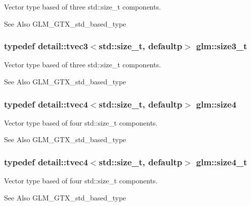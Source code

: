 Vector type based of three std\-::size\-\_\-t components. \begin{DoxySeeAlso}{See Also}
G\-L\-M\-\_\-\-G\-T\-X\-\_\-std\-\_\-based\-\_\-type 
\end{DoxySeeAlso}
\hypertarget{group__gtx__std__based__type_gad9ddaab6dd4c37ba46b74a1423ef2ba3}{
\subsubsection[{size3\-\_\-t}]{\setlength{\rightskip}{0pt plus 5cm}typedef detail\-::tvec3$<$std\-::size\-\_\-t, defaultp$>$ {\bf glm\-::size3\-\_\-t}}}\label{group__gtx__std__based__type_gad9ddaab6dd4c37ba46b74a1423ef2ba3}
Vector type based of three std\-::size\-\_\-t components. \begin{DoxySeeAlso}{See Also}
G\-L\-M\-\_\-\-G\-T\-X\-\_\-std\-\_\-based\-\_\-type 
\end{DoxySeeAlso}
\hypertarget{group__gtx__std__based__type_gac04a40cfe44b5035770cf26d98a9349d}{
\subsubsection[{size4}]{\setlength{\rightskip}{0pt plus 5cm}typedef detail\-::tvec4$<$std\-::size\-\_\-t, defaultp$>$ {\bf glm\-::size4}}}\label{group__gtx__std__based__type_gac04a40cfe44b5035770cf26d98a9349d}
Vector type based of four std\-::size\-\_\-t components. \begin{DoxySeeAlso}{See Also}
G\-L\-M\-\_\-\-G\-T\-X\-\_\-std\-\_\-based\-\_\-type 
\end{DoxySeeAlso}
\hypertarget{group__gtx__std__based__type_gaaaf9b6a73135945e356601a01beece30}{
\subsubsection[{size4\-\_\-t}]{\setlength{\rightskip}{0pt plus 5cm}typedef detail\-::tvec4$<$std\-::size\-\_\-t, defaultp$>$ {\bf glm\-::size4\-\_\-t}}}\label{group__gtx__std__based__type_gaaaf9b6a73135945e356601a01beece30}
Vector type based of four std\-::size\-\_\-t components. \begin{DoxySeeAlso}{See Also}
G\-L\-M\-\_\-\-G\-T\-X\-\_\-std\-\_\-based\-\_\-type 
\end{DoxySeeAlso}
